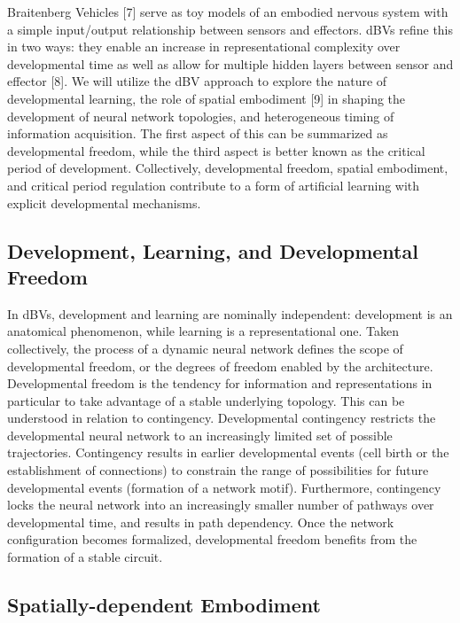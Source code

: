 \documentclass{article}
\begin{document}
Braitenberg Vehicles [7] serve as toy models of an embodied nervous system with a simple input/output relationship between sensors and effectors. dBVs refine this in two ways: they enable an increase in representational complexity over developmental time as well as allow for multiple hidden layers between sensor and effector [8]. We will utilize the dBV approach to explore the nature of developmental learning, the role of spatial embodiment [9] in shaping the development of neural network topologies, and heterogeneous timing of information acquisition. The first aspect of this can be summarized as developmental freedom, while the third aspect is better known as the critical period of development. Collectively, developmental freedom, spatial embodiment, and critical period regulation contribute to a form of artificial learning with explicit developmental mechanisms.

\subsection{Development, Learning, and Developmental Freedom}

In dBVs, development and learning are nominally independent: development is an anatomical phenomenon, while learning is a representational one. Taken collectively, the process of a dynamic neural network defines the scope of developmental freedom, or the degrees of freedom enabled by the architecture. Developmental freedom is the tendency for information and representations in particular to take advantage of a stable underlying topology. This can be understood in relation to contingency. Developmental contingency restricts the developmental neural network to an increasingly limited set of possible trajectories. Contingency results in earlier developmental events (cell birth or the establishment of connections) to constrain the range of possibilities for future developmental events (formation of a network motif). Furthermore, contingency locks the neural network into an increasingly smaller number of pathways over developmental time, and results in path dependency. Once the network configuration becomes formalized, developmental freedom benefits from the formation of a stable circuit. 

\subsection{Spatially-dependent Embodiment}
\end{document}
